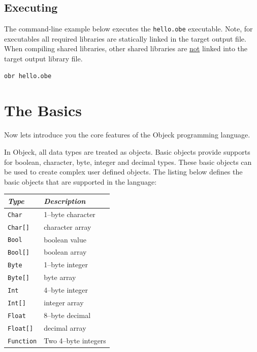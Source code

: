 \documentclass[12pt]{article}
\begin{document}
\subsection{Executing}
The command-line example below executes the \texttt{hello.obe} executable. Note, for executables all required libraries are statically linked in the target output file.  When compiling shared libraries, other shared libraries are \underline{not} linked into the target output library file.

\begin{verbatim}
obr hello.obe
\end{verbatim}

\section{The Basics}
Now lets introduce you the core features of the Objeck programming language.
\vspace{\baselineskip}

In Objeck, all data types are treated as objects. Basic objects provide supports for boolean, character, byte, integer and decimal types.  These basic objects can be used to create complex user defined objects.  The listing below defines the basic objects that are supported in the language:

\begin{center}
\begin{tabular}{| l | l |}
\hline
\emph{Type} & \emph{Description} \\ \hline \hline
\texttt{Char} &  1--byte character \\ \hline
\texttt{Char[]} &  character array \\ \hline
\texttt{Bool} &  boolean value \\ \hline
\texttt{Bool[]} &  boolean array \\ \hline
\texttt{Byte} &  1--byte integer \\ \hline
\texttt{Byte[]} &  byte array \\ \hline
\texttt{Int} &  4--byte integer \\ \hline
\texttt{Int[]} &  integer array \\ \hline
\texttt{Float} &  8--byte decimal \\ \hline
\texttt{Float[]} &  decimal array \\ \hline
\texttt{Function} &  Two 4--byte integers \\ \hline
\end{tabular}
\end{center}
\end{document}
